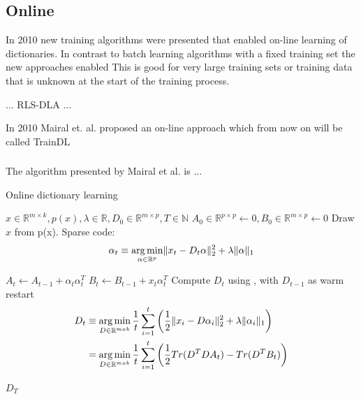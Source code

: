 \subsection{Online}
In 2010 new training algorithms were presented that enabled on-line learning of
dictionaries. In contrast to batch learning algorithms with a fixed training set
the new approaches enabled This is good for very large training sets or training
data that is unknown at the start of the training process.

... RLS-DLA\cite{Engan2010} ...


In 2010 Mairal et. al.\cite{Mairal2010} proposed an on-line approach which from
now on will be called TrainDL

\subsubsection{\trainDL}
\label{sec:mairal}
The algorithm presented by Mairal et al.\cite{Mairal2010} is ...

\begin{algorithm}
\caption{Online dictionary learning\cite{Mairal2010}}
\begin{algorithmic}[1]
\REQUIRE $x \in \mathbb{R}^{m \times k},  p \left( x \right), \lambda \in \mathbb{R}, D_0 \in \mathbb{R}^{m \times p}, T \in \mathbb{N}$
\STATE $A_0 \in \mathbb{R}^{p \times p} \gets  0, B_0 \in \mathbb{R}^{m \times p}\gets 0$
\STATE Draw $x$ from p(x).
\STATE Sparse code:
\begin{align*} 
\alpha_t \equiv \operatorname*{arg\,min}_{\alpha\in\mathbb{R}^{p}}  \lVert x_t - D_t\alpha \rVert^{2}_{2}  +  \lambda \lVert \alpha \rVert_{1}
\end{align*}

\STATE $A_t \gets A_{t-1} + \alpha_t\alpha_t^T$
\STATE $B_t \gets B_{t-1} + x_t\alpha_t^T$
\STATE Compute $D_t$ using , with $D_{t-1}$ as warm restart 
\begin{equation}
\begin{split}
D_t  & \equiv \operatorname*{arg\,min}_{D \in \mathbb{R}^{m x k}}  \frac{1}{t} \sum_{i=1}^t
\left( \frac{1}{2} \lVert x_i - D\alpha_i \rVert^{2}_{2}  +  \lambda \lVert
\alpha_i \rVert_{1} \right) \\
& = \operatorname*{arg\,min}_{D \in \mathbb{R}^{m x k}}  \frac{1}{t} \sum_{i=1}^t
\left( \frac{1}{2} Tr(D^TDA_t) - Tr(D^TB_t)\right) \label{eq:update}
\end{split}
\end{equation}
 
\ENDFOR
\RETURN $D_T$
\end{algorithmic}
\end{algorithm}


